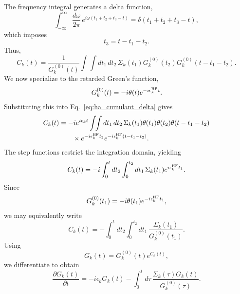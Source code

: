 The frequency integral generates a delta function,
\begin{equation}
    \int_{-\infty}^{\infty}
    \frac{d\omega}{2\pi}\,
    e^{i\omega(t_1+t_2+t_3-t)}
    =
    \delta(t_1+t_2+t_3-t),
\end{equation}
which imposes
\begin{equation}
    t_3=t-t_1-t_2.
\end{equation}
Thus,
\begin{equation}
    C_k(t)
    =
    \frac{1}{G_k^{(0)}(t)}
    \int\!\!\int
    dt_1\,dt_2\,
    \Sigma_k(t_1)
    G_k^{(0)}(t_2)
    G_k^{(0)}(t-t_1-t_2).
\label{eq:ha_cumulant_delta}
\end{equation}
We now specialize to the retarded Green's function,
\begin{equation}
    G_k^{(0)}(t)
    =
    -i\theta(t)e^{-i\epsilon_k^{\rm HF} t}.
\label{eq:ha_retarded_g0}
\end{equation}
Substituting this into Eq.~\eqref{eq:ha_cumulant_delta} gives
\begin{align}
    C_k(t)
    &=
    -i e^{i\epsilon_k t}
    \int\!\!\int
    dt_1\,dt_2\,
    \Sigma_k(t_1)
    \theta(t_1)
    \theta(t_2)
    \theta(t-t_1-t_2)
    \nonumber\\
    &\qquad\times
    e^{-i\epsilon_k^{\rm HF} t_2}
    e^{-i\epsilon_k^{\rm HF}(t-t_1-t_2)}.
\label{eq:ha_cumulant_retarded}
\end{align}
The step functions restrict the integration domain, yielding
\begin{equation}
    C_k(t)
    =
    -i
    \int_0^t dt_2
    \int_0^{t_2} dt_1\,
    \Sigma_k(t_1)
    e^{i\epsilon_k^{\rm HF} t_1}.
\label{eq:ha_cumulant_triangular}
\end{equation}
Since
\begin{equation}
    G_k^{(0)}(t_1)
    =
    -i \theta(t_1)e^{-i\epsilon_k^{\rm HF} t_1},
\end{equation}
we may equivalently write
\begin{equation}
    C_k(t)
    =
    -
    \int_0^t dt_2
    \int_0^{t_2} dt_1\,
    \frac{\Sigma_k(t_1)}
         {G_k^{(0)}(t_1)}.
\label{eq:ha_cumulant_final}
\end{equation}
Using
\begin{equation}
    G_k(t)
    =
    G_k^{(0)}(t)e^{C_k(t)},
\end{equation}
we differentiate to obtain
\begin{equation}
    \frac{\partial G_k(t)}{\partial t}
    =
    -i\epsilon_k G_k(t)
    -
    \int_0^t d\tau\,
    \frac{
        \Sigma_k(\tau)G_k(t)
    }{
        G_k^{(0)}(\tau)
    }.
\label{eq:ha_g_eom}
\end{equation}
